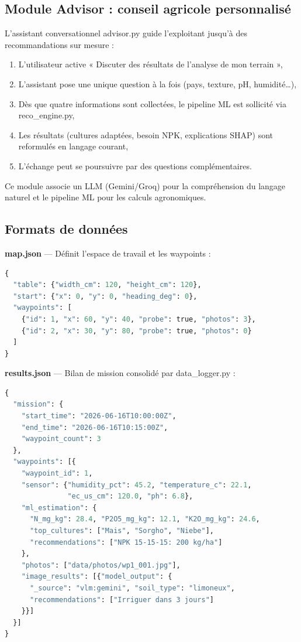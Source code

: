 \documentclass[a4paper,12pt,openany,titlepage]{scrartcl}
\begin{document}
\subsection{Module Advisor : conseil agricole personnalisé}

L’assistant conversationnel advisor.py guide l’exploitant jusqu’à des recommandations sur mesure :
\begin{enumerate}[nosep]
    \item L’utilisateur active « Discuter des résultats de l’analyse de mon terrain »,
    \item L’assistant pose une unique question à la fois (pays, texture, pH, humidité…),
    \item Dès que quatre informations sont collectées, le pipeline ML est sollicité via reco\_engine.py,
    \item Les résultats (cultures adaptées, besoin NPK, explications SHAP) sont reformulés en langage courant,
    \item L’échange peut se poursuivre par des questions complémentaires.
\end{enumerate}

Ce module associe un LLM (Gemini/Groq) pour la compréhension du langage naturel et le pipeline ML pour les calculs agronomiques.

\pagebreak

\subsection{Formats de données}

\textbf{map.json} --- Définit l’espace de travail et les waypoints :
\begin{lstlisting}[language=Python, caption=Structure de map.json]
{
  "table": {"width_cm": 120, "height_cm": 120},
  "start": {"x": 0, "y": 0, "heading_deg": 0},
  "waypoints": [
    {"id": 1, "x": 60, "y": 40, "probe": true, "photos": 3},
    {"id": 2, "x": 30, "y": 80, "probe": true, "photos": 0}
  ]
}
\end{lstlisting}

\textbf{results.json} --- Bilan de mission consolidé par data\_logger.py :
\begin{lstlisting}[language=Python, caption=Structure de results.json]
{
  "mission": {
    "start_time": "2026-06-16T10:00:00Z",
    "end_time": "2026-06-16T10:15:00Z",
    "waypoint_count": 3
  },
  "waypoints": [{
    "waypoint_id": 1,
    "sensor": {"humidity_pct": 45.2, "temperature_c": 22.1,
               "ec_us_cm": 120.0, "ph": 6.8},
    "ml_estimation": {
      "N_mg_kg": 28.4, "P2O5_mg_kg": 12.1, "K2O_mg_kg": 24.6,
      "top_cultures": ["Mais", "Sorgho", "Niebe"],
      "recommendations": ["NPK 15-15-15: 200 kg/ha"]
    },
    "photos": ["data/photos/wp1_001.jpg"],
    "image_results": [{"model_output": {
      "_source": "vlm:gemini", "soil_type": "limoneux",
      "recommendations": ["Irriguer dans 3 jours"]
    }}]
  }]
}
\end{lstlisting}
\end{document}

